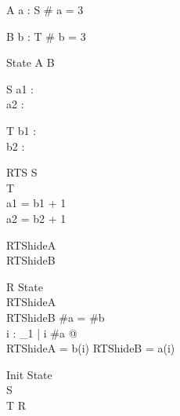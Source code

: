 \begin{schema}{A}
a : \seq S
\where
\# a = 3
\end{schema}

\begin{schema}{B}
b : \seq T
\where
\# b = 3
\end{schema}

\begin{zed}
State  A \land B
\end{zed}

\begin{schema}{S}
a1 : \nat\\
a2 : \nat
\end{schema}

\begin{schema}{T}
b1 : \nat\\
b2 : \nat
\end{schema}

\begin{schema}{RTS}
S\\
T\\
\where
a1 = b1 + 1\\
a2 = b2 + 1
\end{schema}

\begin{zed}
RTShideA \\
RTShideB 
\end{zed}

%
%
\begin{schema}{R}
State\\
RTShideA\\
RTShideB
\where
\#a = \#b\\
\forall i : \nat_1 | i \leq \#a @ \\
      \theta RTShideA = b(i) \land \theta RTShideB = a(i)
\end{schema}

\begin{schema}{Init}
State\\
S\\
T
\where
R
\end{schema}
